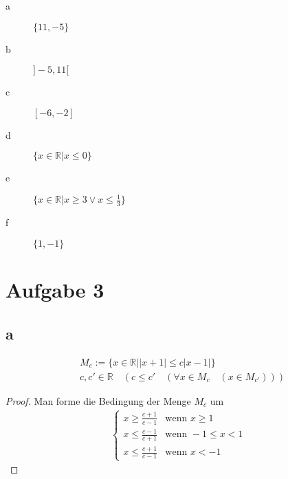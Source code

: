 \documentclass[a4paper,10pt]{article}
\begin{document}
\begin{description}
 \item[a] $\{11, -5\}$
 \item[b] $]-5, 11[$
 \item[c] $[-6, -2]$
 \item[d] $\{ x \in \mathbb{R} | x \le 0\}$
 \item[e] $\{ x \in \mathbb{R} | x \ge 3 \lor x \le \frac{1}{3}\}$
 \item[f] $\{1, -1\}$
\end{description}

\section*{Aufgabe 3}

\subsection*{a}

\begin{claim}
 \begin{align*}
  & M_c := \{ x \in \mathbb{R} | |x + 1| \le c|x - 1| \}\\
  & c, c' \in \mathbb{R} \quad (c \le c' \quad (\forall x \in M_c \quad (x \in M_{c'})))
 \end{align*}
\end{claim}

\begin{proof}
 Man forme die Bedingung der Menge $M_c$ um
 \begin{align*}
  \begin{cases}
   x \ge \frac{c + 1}{c - 1} &\text{wenn } x \ge 1\\
   x \le \frac{c - 1}{c + 1} &\text{wenn } -1 \le x < 1\\
   x \le \frac{c + 1}{c - 1} &\text{wenn } x < -1
  \end{cases}
 \end{align*}
\end{proof}
\end{document}
